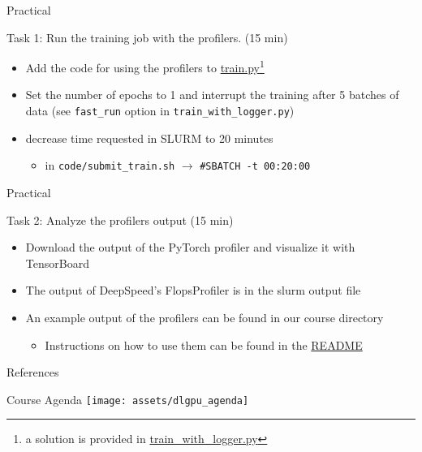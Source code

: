\documentclass[compress,aspectratio=169]{beamer}
\begin{document}
\begin{frame}[fragile]{Practical}
\centering

\begin{block}{Task 1: Run the training job with the profilers. (15 min)}
    \begin{itemize}
        \item Add the code for using the profilers to \href{https://gitlab-ce.gwdg.de/dmuelle3/deep-learning-with-gpu-cores/-/blob/096a3d35e76d60ab557b150c9c3584a0f2c6e52c/code/train.py}{train.py}\footnote{a solution is provided in \href{https://gitlab-ce.gwdg.de/dmuelle3/deep-learning-with-gpu-cores/-/blob/096a3d35e76d60ab557b150c9c3584a0f2c6e52c/code/train_with_logger.py}{train_with_logger.py}}
        \item Set the number of epochs to 1 and interrupt the training after 5 batches of data (see \texttt{fast\_run} option in \texttt{train\_with\_logger.py})
        \item decrease time requested in SLURM to 20 minutes
        \begin{itemize}
            \item in \texttt{code/submit\_train.sh} $\rightarrow$ \texttt{\#SBATCH -t 00:20:00}
        \end{itemize}
    \end{itemize}
\end{block}

\end{frame}

\begin{frame}[fragile]{Practical}
\label{pg:lastpage} %
\centering
\begin{block}{Task 2: Analyze the profilers output (15 min)}
\begin{itemize}
    \item Download the output of the PyTorch profiler and visualize it with TensorBoard
    \item The output of DeepSpeed's FlopsProfiler is in the slurm output file
    \item An example output of the profilers can be found in our course directory
    \begin{itemize}
        \item Instructions on how to use them can be found in the \href{https://gitlab-ce.gwdg.de/dmuelle3/deep-learning-with-gpu-cores/-/tree/main/#download-and-visualize-profiling-results-of-example-run}{README}
    \end{itemize}
\end{itemize}
\end{block}
\end{frame}

\begin{frame}{References}
    \renewcommand*{\bibfont}{\normalfont\scriptsize}
    \printbibliography[heading=none]
\end{frame}

\begin{frame}{Course Agenda}
\centering
\texttt{[image: assets/dlgpu\_agenda]}
\end{frame}
\end{document}
